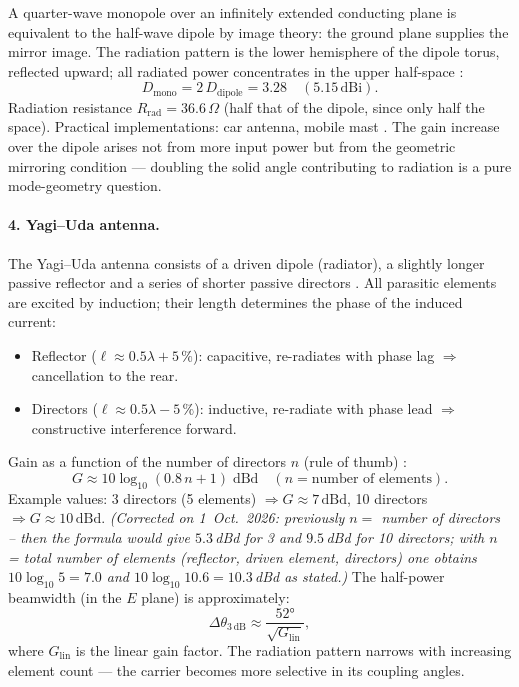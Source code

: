 A quarter-wave monopole over an infinitely extended conducting plane is
equivalent to the half-wave dipole by image theory: the ground plane
supplies the mirror image. The radiation pattern is the lower hemisphere
of the dipole torus, reflected upward; all radiated power concentrates in
the upper half-space \EM:
\[
  D_\mathrm{mono} = 2\,D_\mathrm{dipole} = 3.28 \quad (5.15\,\mathrm{dBi}).
\]
Radiation resistance $R_\mathrm{rad} = 36.6\,\Omega$ (half that of the
dipole, since only half the space). Practical implementations: car antenna,
mobile mast \cite{Balanis2016}. The gain increase over the dipole arises not
from more input power but from the geometric mirroring condition ---
doubling the solid angle contributing to radiation is a pure mode-geometry
question.

\paragraph{4. Yagi--Uda antenna.}

The Yagi--Uda antenna consists of a driven dipole (radiator), a slightly
longer passive reflector and a series of shorter passive directors
\cite{Yagi1928,Balanis2016}. All parasitic elements are excited by induction;
their length determines the phase of the induced current:
\begin{itemize}[nosep]
  \item Reflector ($\ell \approx 0.5\lambda + 5\,\%$): capacitive,
    re-radiates with phase lag $\Rightarrow$ cancellation to the rear.
  \item Directors ($\ell \approx 0.5\lambda - 5\,\%$): inductive,
    re-radiate with phase lead $\Rightarrow$ constructive interference
    forward.
\end{itemize}
Gain as a function of the number of directors $n$ (rule of thumb) \EM:
\[
  G \approx 10\log_{10}(0.8\,n + 1)\;\mathrm{dBd}
  \quad (n = \text{number of elements}).
\]
Example values: 3 directors (5 elements) $\Rightarrow G \approx 7\,\mathrm{dBd}$,
10 directors $\Rightarrow G \approx 10\,\mathrm{dBd}$.
\textit{(Corrected on 1~Oct.~2026: previously $n = $ number of directors -- then the formula would give $5.3$\,dBd for 3 and $9.5$\,dBd for 10 directors; with $n$ = total number of elements (reflector, driven element, directors) one obtains $10\log_{10}5 = 7.0$ and $10\log_{10}10.6 = 10.3$\,dBd as stated.)}
The half-power beamwidth (in the $E$ plane) is approximately:
\[
  \Delta\theta_{3\,\mathrm{dB}} \approx \frac{52°}{\sqrt{G_\mathrm{lin}}},
\]
where $G_\mathrm{lin}$ is the linear gain factor. The radiation pattern
narrows with increasing element count --- the carrier becomes more selective
in its coupling angles.

